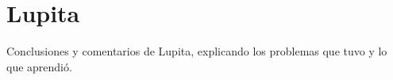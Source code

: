 \section{Lupita}
Conclusiones y comentarios de Lupita, explicando los problemas que tuvo y lo que aprendió.